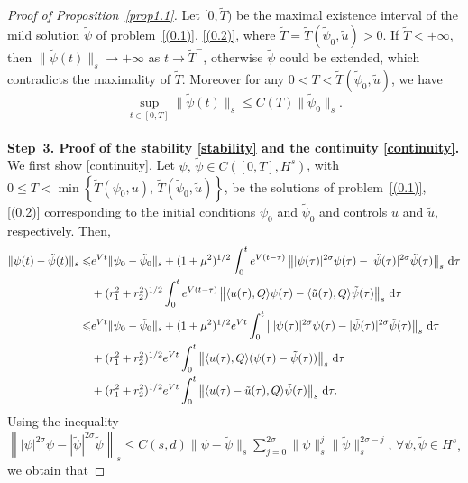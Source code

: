 \documentclass[review]{elsarticle}
\theoremstyle{dotless}
\def\d{{\,\rm d}}
\def \leq{\leqslant}
\numberwithin{equation}{section}
\begin{document}
\begin{proof}[Proof of Proposition~\ref{prop1.1}]
	Let $ [0,\tilde{T}) $ be the maximal existence interval of the mild solution $ \tilde{\psi} $ of problem~\eqref{(0.1)}, \eqref{(0.2)}, where $ \tilde{T}=\tilde{T}\left(\tilde{\psi}_0,\tilde{u}\right)>0 $. If $ \tilde{T}<+\infty $, then $ \|\tilde{\psi}(t)\|_s\rightarrow+\infty $ as
	$ t\rightarrow \tilde{T}^- $, otherwise $ \tilde{\psi} $ could be extended, which contradicts the maximality of $ \tilde{T} $. Moreover
	for any $0<T<\tilde{T}\left(\tilde{\psi}_0,\tilde{u}\right)$, we have
	\begin{equation}\label{bounded}
		\sup _{t \in[0, T]}\|\tilde{\psi}(t)\|_{s} \leq C(T) \|\tilde{\psi}_0 \|_{s}.
	\end{equation}
	\\
	\textbf{Step~3. Proof of the stability \eqref{stability} and the continuity \eqref{continuity}. }
	\\
	We first show \eqref{continuity}. Let $\psi,\, \tilde{\psi} \in C\left([0, T], H^s\right)$, with $0 \leq T < \min \left\{\tilde{T}\left(\psi_0,u\right),\, \tilde{T}\left(\tilde{\psi}_0,\tilde{u}\right)\right\}$, be the solutions of problem~\eqref{(0.1)}, \eqref{(0.2)} corresponding to the initial conditions $\psi_0$ and $\tilde{\psi}_0$ and controls $u$ and $\tilde{u}$, respectively. Then,
	\begin{equation*}
		\begin{aligned}
			\|\psi(t)-\tilde{\psi}(t)\|_{s} \leq & e^{Vt} \| \psi_0-\tilde{\psi}_0 \|_{s} + (1+ \mu^2)^{1/2}\int_0^t e^{V(t-\tau)}\left\||\psi(\tau)|^{2 \sigma} \psi(\tau)-|\tilde{\psi}(\tau)|^{2 \sigma} \tilde{\psi}(\tau) \right\|_s\d\tau \\
			&+(r_1^2+r_2^2)^{1/2}\int_0^te^{V(t-\tau)}\left\|\langle u(\tau),Q\rangle\psi(\tau)-\langle \tilde{u}(\tau),Q\rangle\tilde{\psi}(\tau)\right\|_s\d\tau\\
			\leq & e^{Vt} \| \psi_0-\tilde{\psi}_0 \|_{s} + (1+ \mu^2)^{1/2} e^{Vt}\int_0^t\left\||\psi(\tau)|^{2 \sigma} \psi(\tau)-|\tilde{\psi}(\tau)|^{2 \sigma} \tilde{\psi}(\tau) \right\|_s\d\tau \\
			&+(r_1^2+r_2^2)^{1/2}e^{Vt}\int_0^t\left\|\langle u(\tau),Q\rangle(\psi(\tau)-\tilde{\psi}(\tau)) \right\|_s\d\tau\\
			&+(r_1^2+r_2^2)^{1/2}e^{Vt}\int_0^t\left\|\langle u(\tau)-\tilde{u}(\tau),Q\rangle\tilde{\psi}(\tau)\right\|_s\d\tau.
		\end{aligned}
	\end{equation*}
	Using the inequality $\left\||\psi |^{2 \sigma} \psi -|\tilde{\psi} |^{2 \sigma} \tilde{\psi}  \right\|_s\leq C(s,d) \|\psi -\tilde{\psi} \|_s \sum_{j=0}^{2\sigma}\|\psi \|_s^j\|\tilde{\psi} \|_s^{2\sigma-j},\, \forall \psi,\tilde{\psi}\in H^s$, we obtain that

\end{proof}
\end{document}
